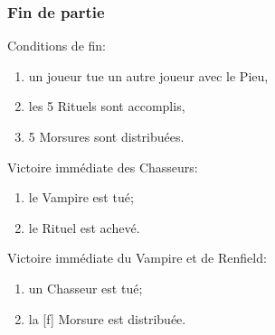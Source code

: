 \documentclass[11pt]{beamer}
\begin{document}
\begin{frame}
	\label{frame:end}
	\frametitle{Fin de partie}
	
	
	Conditions de fin:
	\begin{enumerate}
		\item un joueur tue un autre joueur avec le Pieu,
		\item les 5 Rituels sont accomplis,
		\item 5 Morsures sont distribuées.
	\end{enumerate}
	
	\vspace*{1ex}
	
	Victoire immédiate des Chasseurs:
	\begin{enumerate}
		\item le Vampire est tué;
		\item le  Rituel est achevé.
	\end{enumerate}

	Victoire immédiate du Vampire et de Renfield:
	\begin{enumerate}
		\item un Chasseur est tué;
		\item la [f] Morsure est distribuée.
	\end{enumerate}
\end{frame}

%	
%
%	
\end{document}
